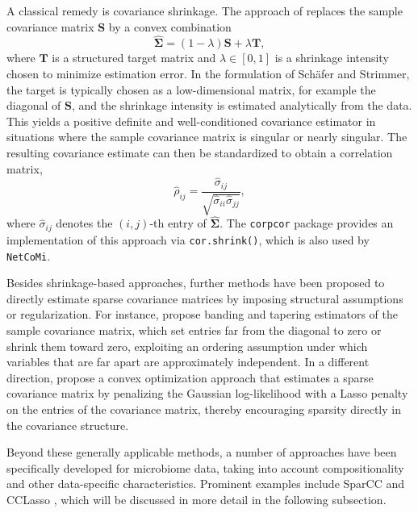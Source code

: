 A classical remedy is covariance shrinkage. The approach of \citet{schafer2005shrinkage} replaces the sample covariance matrix $\mathbf{S}$ by a convex combination
\begin{equation}
\hat{\boldsymbol{\Sigma}} = (1-\lambda)\mathbf{S} + \lambda \mathbf{T},
\end{equation}
where $\mathbf{T}$ is a structured target matrix and $\lambda \in [0,1]$ is a shrinkage intensity chosen to minimize estimation error. In the formulation of Schäfer and Strimmer, the target is typically chosen as a low-dimensional matrix, for example the diagonal of $\mathbf{S}$, and the shrinkage intensity is estimated analytically from the data. This yields a positive definite and well-conditioned covariance estimator in situations where the sample covariance matrix is singular or nearly singular. The resulting covariance estimate can then be standardized to obtain a correlation matrix,
\begin{equation}
\hat{\rho}_{ij}=\frac{\hat{\sigma}_{ij}}{\sqrt{\hat{\sigma}_{ii}\hat{\sigma}_{jj}}},
\end{equation}
where $\hat{\sigma}_{ij}$ denotes the $(i,j)$-th entry of $\hat{\boldsymbol{\Sigma}}$.
The \texttt{corpcor} package \citep{schafer2021corpcor} provides an implementation of this approach via \texttt{cor.shrink()}, which is also used by \texttt{NetCoMi}.

Besides shrinkage-based approaches, further methods have been proposed to directly estimate sparse covariance matrices by imposing structural assumptions or regularization. 
For instance, \citet{bickel2008regularized} propose banding and tapering estimators of the sample covariance matrix, which set entries far from the diagonal to zero or shrink them toward zero, exploiting an ordering assumption under which variables that are far apart are approximately independent.  
In a different direction, \citet{bien2011sparse} propose a convex optimization approach that estimates a sparse covariance matrix by penalizing the Gaussian log-likelihood with a Lasso penalty on the entries of the covariance matrix, thereby encouraging sparsity directly in the covariance structure.

Beyond these generally applicable methods, a number of approaches have been specifically developed for microbiome data, taking into account compositionality and other data-specific characteristics. Prominent examples include SparCC \citep{friedman2012inferring} and CCLasso \citep{fang2015cclasso}, which will be discussed in more detail in the following subsection.

